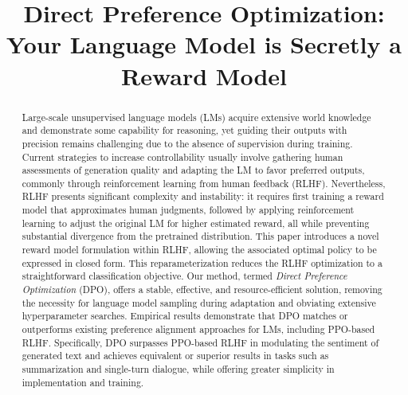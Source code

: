 \title{Direct Preference Optimization: Your Language Model is Secretly a Reward Model}

\begin{abstract}
Large-scale unsupervised language models (LMs) acquire extensive world knowledge and demonstrate some capability for reasoning, yet guiding their outputs with precision remains challenging due to the absence of supervision during training. Current strategies to increase controllability usually involve gathering human assessments of generation quality and adapting the LM to favor preferred outputs, commonly through reinforcement learning from human feedback (RLHF). Nevertheless, RLHF presents significant complexity and instability: it requires first training a reward model that approximates human judgments, followed by applying reinforcement learning to adjust the original LM for higher estimated reward, all while preventing substantial divergence from the pretrained distribution. This paper introduces a novel reward model formulation within RLHF, allowing the associated optimal policy to be expressed in closed form. This reparameterization reduces the RLHF optimization to a straightforward classification objective. Our method, termed \textit{Direct Preference Optimization} (DPO), offers a stable, effective, and resource-efficient solution, removing the necessity for language model sampling during adaptation and obviating extensive hyperparameter searches. Empirical results demonstrate that DPO matches or outperforms existing preference alignment approaches for LMs, including PPO-based RLHF. Specifically, DPO surpasses PPO-based RLHF in modulating the sentiment of generated text and achieves equivalent or superior results in tasks such as summarization and single-turn dialogue, while offering greater simplicity in implementation and training.
\end{abstract}

